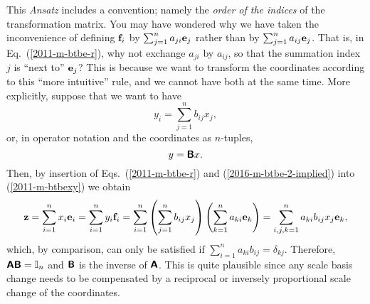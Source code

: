 This {\it Ansatz} includes a convention; namely the {\em order of the indices} of the transformation matrix.
You may have wondered why we have taken the inconvenience of defining
${\bf f}_i$ by $\sum_{j=1}^n a_{ji} {\bf e}_j$ rather than by $\sum_{j=1}^n a_{ij} {\bf e}_j$.
That is, in  Eq.~(\ref{2011-m-btbe-r}), why not exchange $a_{ji}$ by $a_{ij}$,
so that the summation index $j$ is ``next to'' ${\bf e}_j$?
This is because we want to transform the coordinates according to this ``more intuitive'' rule, and we cannot have both
at the same time.
More explicitly, suppose that we want to have
\begin{equation}
y_i =\sum_{j=1}^n b_{ij} x_j
,
\label{2016-m-btbe-2-implied}
\end{equation}
or, in operator notation and the coordinates as $n$-tuples,
\begin{equation}
y = \textsf{\textbf{B}} x
.
\label{2016-m-btbe-2-impliedm}
\end{equation}
Then, by insertion of  Eqs.~(\ref{2011-m-btbe-r}) and (\ref{2016-m-btbe-2-implied}) into (\ref{2011-m-btbexy})
we obtain
\begin{equation}
{\bf z}=
\sum_{i=1}^n x_i{\bf e}_i
=
\sum_{i=1}^n  y_i{\bf f}_i
= \sum_{i=1}^n \left( \sum_{j=1}^n b_{ij} x_j \right)   \left( \sum_{k=1}^n a_{ki} {\bf e}_k \right)
= \sum_{i,j,k=1}^n  a_{ki} b_{ij}  x_j {\bf e}_k
,
\label{2016-m-btbexy}
\end{equation}
which, by comparison, can only be satisfied if  $\sum_{i=1}^n  a_{ki} b_{ij} = \delta_{kj}$.
Therefore, $\textsf{\textbf{A}}\textsf{\textbf{B}} = {\Bbb I}_n$ and
$\textsf{\textbf{B}}$   is the inverse of
$\textsf{\textbf{A}}$.
This is quite plausible since any scale basis change needs to be compensated by a reciprocal or inversely proportional
scale change of the coordinates.




